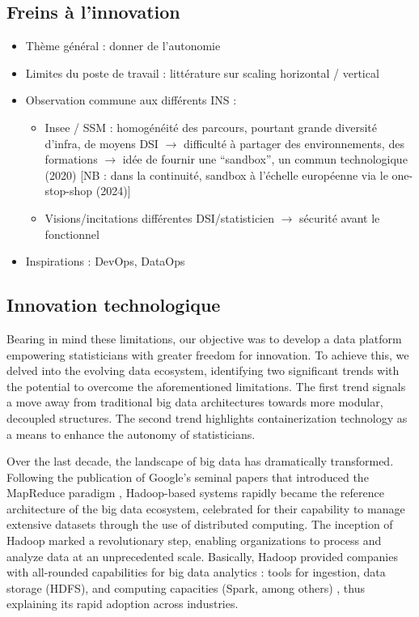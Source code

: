 \subsection{Freins à l'innovation}
\begin{itemize}
    \item Thème général : donner de l'autonomie
    \item Limites du poste de travail : littérature sur scaling horizontal / vertical
    \item Observation commune aux différents INS :
    \begin{itemize}
        \item Insee / SSM : homogénéité des parcours, pourtant grande diversité d'infra, de moyens DSI $\rightarrow$ difficulté à partager des environnements, des formations $\rightarrow$ idée de fournir une ``sandbox'', un commun technologique (2020) [NB : dans la continuité, sandbox à l'échelle européenne via le one-stop-shop (2024)]
        \item Visions/incitations différentes DSI/statisticien $\rightarrow$ sécurité avant le fonctionnel
    \end{itemize}
    \item Inspirations : DevOps, DataOps
\end{itemize}

\subsection{Innovation technologique}

Bearing in mind these limitations, our objective was to develop a data platform empowering statisticians with greater freedom for innovation. To achieve this, we delved into the evolving data ecosystem, identifying two significant trends with the potential to overcome the aforementioned limitations. The first trend signals a move away from traditional big data architectures towards more modular, decoupled structures. The second trend highlights containerization technology as a means to enhance the autonomy of statisticians.

Over the last decade, the landscape of big data has dramatically transformed. Following the publication of Google's seminal papers that introduced the MapReduce paradigm \cite{ghemawat2003google, dean2008mapreduce}, Hadoop-based systems rapidly became the reference architecture of the big data ecosystem, celebrated for their capability to manage extensive datasets through the use of distributed computing. The inception of Hadoop marked a revolutionary step, enabling organizations to process and analyze data at an unprecedented scale. Basically, Hadoop provided companies with all-rounded capabilities for big data analytics : tools for ingestion, data storage (HDFS), and computing capacities (Spark, among others) \cite{dhyani2014big}, thus explaining its rapid adoption across industries.

